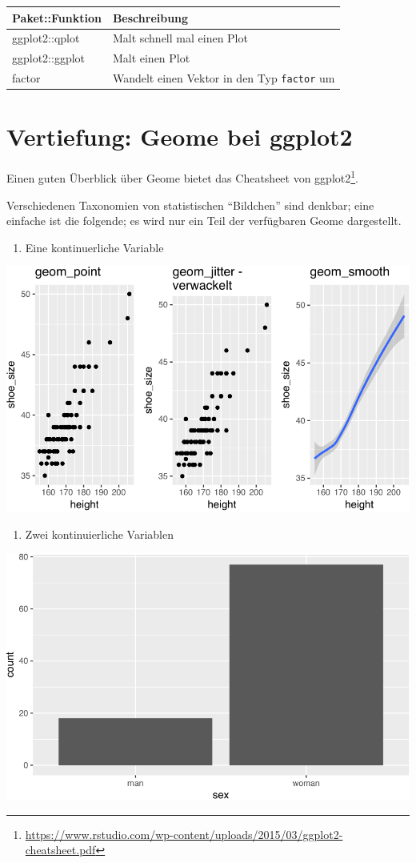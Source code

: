 \documentclass[12pt,ngerman,]{book}
\providecommand{\tightlist}{%
  \setlength{\itemsep}{0pt}\setlength{\parskip}{0pt}}
\let\rmarkdownfootnote\footnote%
\def\footnote{\protect\rmarkdownfootnote}
\begin{document}
\begin{longtable}[]{@{}ll@{}}
\toprule
Paket::Funktion & Beschreibung\tabularnewline
\midrule
\endhead
ggplot2::qplot & Malt schnell mal einen Plot\tabularnewline
ggplot2::ggplot & Malt einen Plot\tabularnewline
factor & Wandelt einen Vektor in den Typ \texttt{factor}
um\tabularnewline
\bottomrule
\end{longtable}

\section{Vertiefung: Geome bei ggplot2}\label{geome}

Einen guten Überblick über Geome bietet das Cheatsheet von
ggplot2\footnote{\url{https://www.rstudio.com/wp-content/uploads/2015/03/ggplot2-cheatsheet.pdf}}.

Verschiedenen Taxonomien von statistischen ``Bildchen'' sind denkbar;
eine einfache ist die folgende; es wird nur ein Teil der verfügbaren
Geome dargestellt.

\begin{enumerate}
\def\labelenumi{\arabic{enumi}.}
\tightlist
\item
  Eine kontinuerliche Variable
\end{enumerate}

\begin{center}\includegraphics[width=0.7\linewidth]{050_Daten_visualisieren_files/figure-latex/unnamed-chunk-34-1} \end{center}

\begin{enumerate}
\def\labelenumi{\arabic{enumi}.}
\setcounter{enumi}{1}
\tightlist
\item
  Zwei kontinuierliche Variablen
\end{enumerate}

\begin{center}\includegraphics[width=0.7\linewidth]{050_Daten_visualisieren_files/figure-latex/unnamed-chunk-35-1} \end{center}
\end{document}
